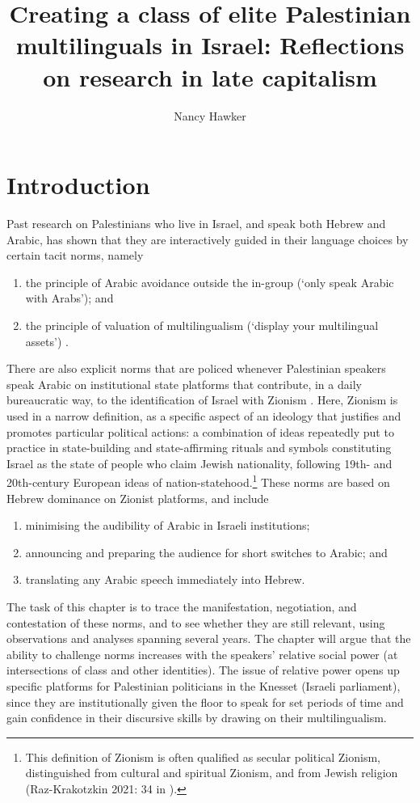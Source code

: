 \documentclass[output=paper,arabicfont]{langscibook}
\author{Nancy Hawker \orcid{0000-0002-0693-4045} \affiliation{Independent researcher}}
\title [Creating a class of elite Palestinian multilinguals in Israel]
{Creating a class of elite Palestinian multilinguals in Israel: Reflections on research in late capitalism}
\begin{document}
\maketitle

\section{Introduction} 
Past research on Palestinians who live in Israel, and speak both Hebrew and Arabic, has shown that they are interactively guided in their language choices by certain tacit norms, namely
\begin{enumerate}
\item the principle of Arabic avoidance outside the in-group (‘only speak Arabic with Arabs'); and
\item the principle of valuation of multilingualism (‘display your multilingual assets') \citep{hawker2019a}.
\end{enumerate}

There are also explicit norms that are policed whenever Palestinian speakers speak Arabic on institutional state platforms that contribute, in a daily bureaucratic way, to the identification of Israel with Zionism \citep{handelman2020a}. Here, Zionism is used in a narrow definition, as a specific aspect of an ideology that justifies and promotes particular political actions: a combination of ideas repeatedly put to practice in state-building and state-affirming rituals and symbols constituting Israel as the state of people who claim Jewish nationality, following 19th- and 20th-century European ideas of nation-statehood.\footnote{This definition of Zionism is often qualified as secular political Zionism, distinguished from cultural and spiritual Zionism, and from Jewish religion (Raz-Krakotzkin 2021: 34 in \cite{rouhana2021a}).} These norms are based on Hebrew dominance on Zionist platforms, and include 
\begin{enumerate}
\item minimising the audibility of Arabic in Israeli institutions;
\item announcing and preparing the audience for short switches to Arabic; and
\item translating any Arabic speech immediately into Hebrew.
\end{enumerate}

The task of this chapter is to trace the manifestation, negotiation, and contestation of these norms, and to see whether they are still relevant, using observations and analyses spanning several years. The chapter will argue that the ability to challenge norms increases with the speakers’ relative social power (at intersections of class and other identities). The issue of relative power opens up specific platforms for Palestinian politicians in the Knesset (Israeli parliament), since they are institutionally given the floor to speak for set periods of time and gain confidence in their discursive skills by drawing on their multilingualism. 
\end{document}
